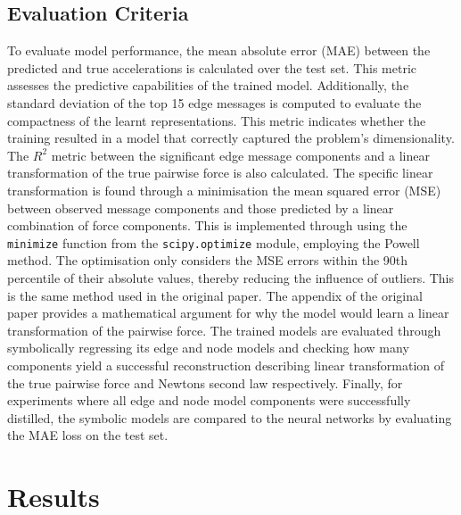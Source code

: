 \documentclass[11pt]{article}
\begin{document}
\subsection{Evaluation Criteria}
To evaluate model performance, the mean absolute error (MAE) between the predicted and true accelerations is calculated over the test set. This metric assesses the predictive capabilities of the trained model. Additionally, the standard deviation of the top 15 edge messages is computed to evaluate the compactness of the learnt representations. This metric indicates whether the training resulted in a model that correctly captured the problem's dimensionality. The $R^2$ metric between the significant edge message components and a linear transformation of the true pairwise force is also calculated. The specific linear transformation is found through a minimisation the mean squared error (MSE) between observed message components and those predicted by a linear combination of force components. This is implemented through using the \texttt{minimize} function from the \texttt{scipy.optimize} module, employing the Powell method. The optimisation only considers the MSE errors within the 90th percentile of their absolute values, thereby reducing the influence of outliers. This is the same method used in the original paper. The appendix of the original paper provides a mathematical argument for why the model would learn a linear transformation of the pairwise force. The trained models are evaluated through symbolically regressing its edge and node models and checking how many components yield a successful reconstruction describing linear transformation of the true pairwise force and Newtons second law respectively. Finally, for experiments where all edge and node model components were successfully distilled, the symbolic models are compared to the neural networks by evaluating the MAE loss on the test set.

\section{Results}
\end{document}
